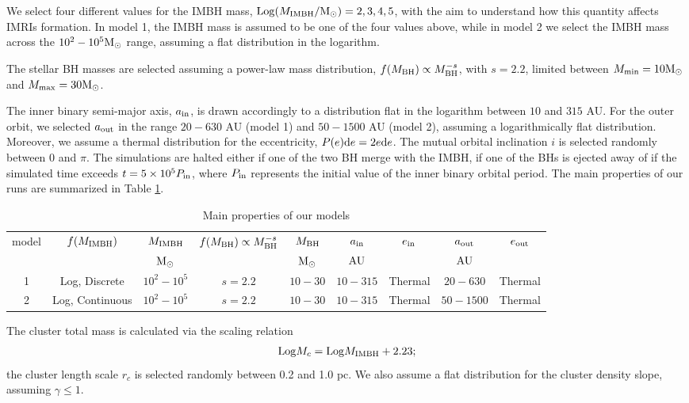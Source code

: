 \documentclass[twocolumn]{aastex62}
\newcommand{\Ms}{{\rm M}_\odot}
\newcommand{\au}{{\rm AU}}
\newcommand{\ibh}{{\rm IMBH}}
\newcommand{\inn}{{\rm in}}
\newcommand{\out}{{\rm out}}
\newcommand{\bh}{{\rm BH}}
\begin{document}
We select four different values for the IMBH mass, ${\rm Log}(M_\ibh/\Ms) = 2,3,4,5$, with the aim to understand how this quantity affects IMRIs formation. In model 1, the IMBH mass is assumed to be one of the four values above, while in model 2 we select the IMBH mass across the $10^2-10^5\Ms$ range, assuming a flat distribution in the logarithm.

The stellar BH masses are selected assuming a power-law mass distribution, $f(M_\bh)\propto M_\bh^{-s}$, with $s = 2.2$, limited between $M_{\rm min} = 10\Ms$ and $M_{\rm max} = 30\Ms$.

The inner binary semi-major axis, $a_\inn$, is drawn accordingly to a distribution flat in the logarithm between $10$ and $315$ AU. For the outer orbit, we selected $a_\out$ in the range $20 - 630$ AU (model 1) and $50 - 1500 $ AU (model 2), assuming a logarithmically flat distribution.
Moreover, we assume a thermal distribution for the eccentricity, $P(e){\rm d}e = 2e{\rm d}e$. The mutual orbital inclination $i$ is selected randomly between $0$ and $\pi$.
The simulations are halted either if one of the two BH merge with the IMBH, if one of the BHs is ejected away of if the simulated time exceeds $t = 5\times 10^5 P_\inn$, where $P_\inn$ represents the initial value of the inner binary orbital period. 
The main properties of our runs are summarized in Table \ref{t1}.

\begin{table}
\caption{Main properties of our models}
\begin{center}
\begin{tabular}{ccccccccc}
\hline
model   & $f(M_\ibh)$ & $M_\ibh$ & $f(M_\bh)\propto M_\bh^{-s}$ & $M_\bh$ & $a_\inn$ & $e_\inn$ & $a_\out$ & $e_\out$ \\ 
        &             & $\Ms$    &            & $\Ms$   & $\au$    &          & $\au$    &          \\
\hline 
1 & Log, Discrete & $10^2-10^5$ & $s=2.2$ & $10-30$ & $10-315$ & Thermal & $20-630$ & Thermal \\
2 & Log, Continuous & $10^2-10^5$ & $s=2.2$ & $10-30$ & $10-315$ & Thermal & $50-1500$ & Thermal \\
\hline
\end{tabular}
\end{center}
\label{t1}
\end{table}


The cluster total mass is calculated via the scaling relation \citep{AS16}
\begin{equation}
{\rm Log} M_c = {\rm Log} M_\ibh + 2.23;
\label{mcmibh}
\end{equation}
the cluster length scale $r_c$ is selected randomly between 0.2 and 1.0 pc. We also assume a flat distribution for the cluster density slope, assuming $\gamma \leq 1$.
\end{document}
